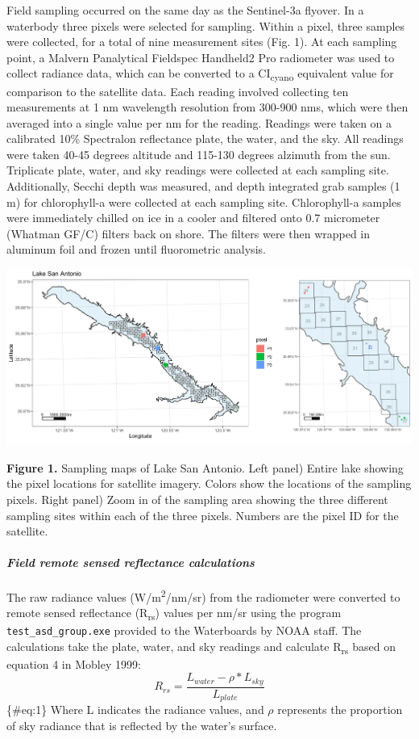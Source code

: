 \documentclass[]{article}
\let\oldparagraph\paragraph
\renewcommand{\paragraph}[1]{\oldparagraph{#1}\mbox{}}
\begin{document}
Field sampling occurred on the same day as the Sentinel-3a flyover. In a
waterbody three pixels were selected for sampling. Within a pixel, three
samples were collected, for a total of nine measurement sites (Fig. 1).
At each sampling point, a Malvern Panalytical Fieldspec Handheld2 Pro
radiometer was used to collect radiance data, which can be converted to
a CI\textsubscript{cyano} equivalent value for comparison to the
satellite data. Each reading involved collecting ten measurements at 1
nm wavelength resolution from 300-900 nms, which were then averaged into
a single value per nm for the reading. Readings were taken on a
calibrated 10\% Spectralon reflectance plate, the water, and the sky.
All readings were taken 40-45 degrees altitude and 115-130 degrees
alzimuth from the sun. Triplicate plate, water, and sky readings were
collected at each sampling site. Additionally, Secchi depth was
measured, and depth integrated grab samples (1 m) for chlorophyll-a were
collected at each sampling site. Chlorophyll-a samples were immediately
chilled on ice in a cooler and filtered onto 0.7 micrometer (Whatman
GF/C) filters back on shore. The filters were then wrapped in aluminum
foil and frozen until fluorometric analysis.

\includegraphics[width=0.3\linewidth]{../Data/Figures_output/Map_Figure}

\textbf{Figure 1.} Sampling maps of Lake San Antonio. Left panel) Entire
lake showing the pixel locations for satellite imagery. Colors show the
locations of the sampling pixels. Right panel) Zoom in of the sampling
area showing the three different sampling sites within each of the three
pixels. Numbers are the pixel ID for the satellite.

\paragraph{\texorpdfstring{\emph{Field remote sensed reflectance
calculations}}{Field remote sensed reflectance calculations}}\label{field-remote-sensed-reflectance-calculations}

The raw radiance values (W/m\textsuperscript{2}/nm/sr) from the
radiometer were converted to remote sensed reflectance
(R\textsubscript{rs}) values per nm/sr using the program
\texttt{test\_asd\_group.exe} provided to the Waterboards by NOAA staff.
The calculations take the plate, water, and sky readings and calculate
R\textsubscript{rs} based on equation 4 in Mobley 1999: \[
\begin{equation}
R_{rs} = \frac{L_{water} - \rho * L_{sky}}{L_{plate}}
\end{equation}
\] \{\#eq:1\} Where L indicates the radiance values, and \(\rho\)
represents the proportion of sky radiance that is reflected by the
water's surface.
\end{document}
